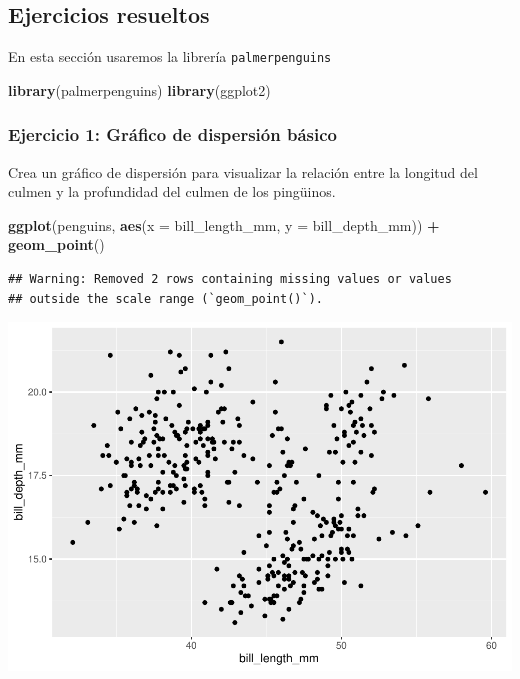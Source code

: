 \documentclass[
]{book}
\newenvironment{Shaded}{\begin{snugshade}}{\end{snugshade}}
\newcommand{\AttributeTok}[1]{\textcolor[rgb]{0.13,0.29,0.53}{#1}}
\newcommand{\FunctionTok}[1]{\textcolor[rgb]{0.13,0.29,0.53}{\textbf{#1}}}
\newcommand{\NormalTok}[1]{#1}
\newcommand{\SpecialCharTok}[1]{\textcolor[rgb]{0.81,0.36,0.00}{\textbf{#1}}}
\begin{document}
\subsection{Ejercicios resueltos}\label{ejercicios-resueltos}

En esta sección usaremos la librería \texttt{palmerpenguins}

\begin{Shaded}
\begin{Highlighting}[]
\FunctionTok{library}\NormalTok{(palmerpenguins)}
\FunctionTok{library}\NormalTok{(ggplot2)}
\end{Highlighting}
\end{Shaded}

\subsubsection{Ejercicio 1: Gráfico de dispersión básico}\label{ejercicio-1-gruxe1fico-de-dispersiuxf3n-buxe1sico}

Crea un gráfico de dispersión para visualizar la relación entre la longitud del culmen y la profundidad del culmen de los pingüinos.

\begin{Shaded}
\begin{Highlighting}[]
\FunctionTok{ggplot}\NormalTok{(penguins, }\FunctionTok{aes}\NormalTok{(}\AttributeTok{x =}\NormalTok{ bill\_length\_mm, }\AttributeTok{y =}\NormalTok{ bill\_depth\_mm)) }\SpecialCharTok{+}
  \FunctionTok{geom\_point}\NormalTok{()}
\end{Highlighting}
\end{Shaded}

\begin{verbatim}
## Warning: Removed 2 rows containing missing values or values
## outside the scale range (`geom_point()`).
\end{verbatim}

\includegraphics{bookdown-demo_files/figure-latex/unnamed-chunk-183-1.pdf}
\end{document}
